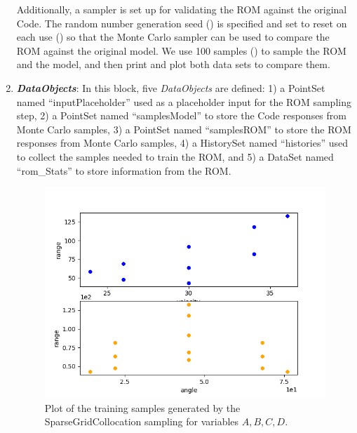 \begin{enumerate}
  Additionally, a  sampler is set up for validating the ROM against the original Code.  The random number generation seed () is specified and set to reset on each use () so that the Monte Carlo sampler can be used to compare the ROM against the  original model.  We use 100 samples () to sample the ROM and the model, and then print and plot both data sets to compare them.
   \item \textbf{\textit{DataObjects}}:
  In this block, five \textit{DataObjects} are defined:
  1) a PointSet named ``inputPlaceholder'' used as a placeholder input for the ROM sampling step,
  2) a PointSet named ``samplesModel'' to store the Code responses from Monte Carlo samples,
  3) a PointSet named ``samplesROM'' to store the ROM responses from Monte Carlo samples,
  4) a HistorySet named ``histories'' used to collect the samples needed to train the ROM, and
  5) a DataSet named ``rom_Stats'' to store information from the ROM.
 \begin{figure}[h!]
  \centering
  \includegraphics[scale=0.7]{../../tests/framework/user_guide/ForwardSamplingStrategies/gold/RunDir/SparseGrid/1-historyPlot_scatter-scatter.png}
  \caption{Plot of the training samples generated by the SparseGridCollocation sampling for variables $A,B,C,D$.}
  \label{fig:historiesSparseGridPlotScatter}

\end{figure}
\end{enumerate}
